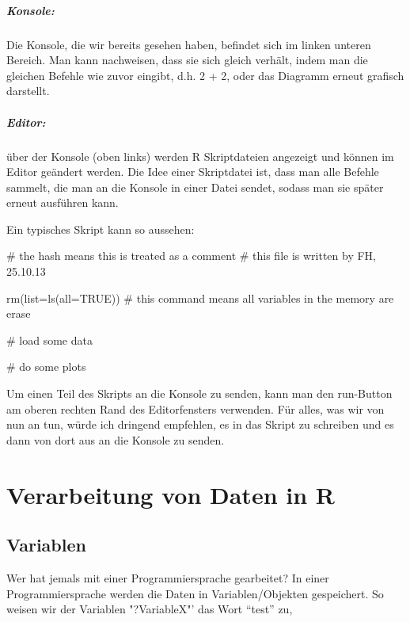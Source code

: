 \documentclass[a4paper,twoside]{tufte-book}\usepackage[]{graphicx}\usepackage[]{color}
\begin{document}
\begin{appendices}
\paragraph{Konsole:} Die Konsole, die wir bereits gesehen haben, befindet sich im linken unteren Bereich. Man kann nachweisen, dass sie sich gleich verhält, indem man die gleichen Befehle wie zuvor eingibt, d.h. 2 + 2, oder das Diagramm erneut grafisch darstellt.

\paragraph{Editor:} über der Konsole (oben links) werden R Skriptdateien angezeigt und können im Editor geändert werden. Die Idee einer Skriptdatei ist, dass man alle Befehle sammelt, die man an die Konsole in einer Datei sendet, sodass man sie später erneut ausführen kann.  

Ein typisches Skript kann so aussehen:

\begin{Schunk}
\begin{Sinput}
# the hash means this is treated as a comment
# this file is written by FH, 25.10.13

rm(list=ls(all=TRUE))  # this command means all variables in the memory are erase

# load some data

# do some plots
\end{Sinput}
\end{Schunk}

Um einen Teil des Skripts an die Konsole zu senden, kann man den run-Button am oberen rechten Rand des Editorfensters verwenden. Für alles, was wir von nun an tun, würde ich dringend empfehlen, es in das Skript zu schreiben und es dann von dort aus an die Konsole zu senden.

\chapter{Verarbeitung von Daten in R}
\label{HandlingDataInR}

\section{Variablen}

Wer hat jemals mit einer Programmiersprache gearbeitet? In einer Programmiersprache werden die Daten in Variablen/Objekten gespeichert. So weisen wir der Variablen "?VariableX"' das Wort "`test"' zu,


\end{appendices}
\end{document}
